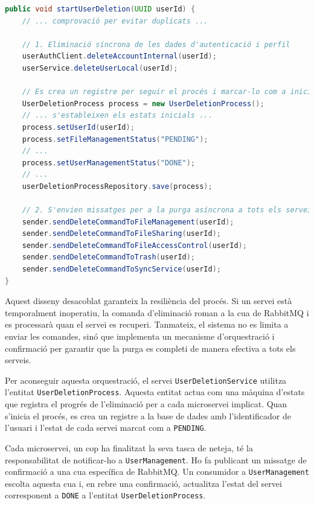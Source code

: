 \begin{lstlisting}[language=Java, caption={Inici del procés d'eliminació a `UserDeletionService`}]
public void startUserDeletion(UUID userId) {
    // ... comprovació per evitar duplicats ...

    // 1. Eliminació síncrona de les dades d'autenticació i perfil
    userAuthClient.deleteAccountInternal(userId);
    userService.deleteUserLocal(userId);

    // Es crea un registre per seguir el procés i marcar-lo com a iniciat
    UserDeletionProcess process = new UserDeletionProcess();
    // ... s'estableixen els estats inicials ...
    process.setUserId(userId);
    process.setFileManagementStatus("PENDING");
    // ...
    process.setUserManagementStatus("DONE");
    // ...
    userDeletionProcessRepository.save(process);

    // 2. S'envien missatges per a la purga asíncrona a tots els serveis implicats
    sender.sendDeleteCommandToFileManagement(userId);
    sender.sendDeleteCommandToFileSharing(userId);
    sender.sendDeleteCommandToFileAccessControl(userId);
    sender.sendDeleteCommandToTrash(userId);
    sender.sendDeleteCommandToSyncService(userId);
}
\end{lstlisting}

Aquest disseny desacoblat garanteix la resiliència del procés. Si un servei està temporalment inoperatiu, la comanda d'eliminació roman a la cua de RabbitMQ i es processarà quan el servei es recuperi. Tanmateix, el sistema no es limita a enviar les comandes, sinó que implementa un mecanisme d'orquestració i confirmació per garantir que la purga es completi de manera efectiva a tots els serveis.

Per aconseguir aquesta orquestració, el servei \texttt{UserDeletionService} utilitza l'entitat \texttt{UserDeletionProcess}. Aquesta entitat actua com una màquina d'estats que registra el progrés de l'eliminació per a cada microservei implicat. Quan s'inicia el procés, es crea un registre a la base de dades amb l'identificador de l'usuari i l'estat de cada servei marcat com a \texttt{PENDING}.

Cada microservei, un cop ha finalitzat la seva tasca de neteja, té la responsabilitat de notificar-ho a \texttt{UserManagement}. Ho fa publicant un missatge de confirmació a una cua específica de RabbitMQ. Un consumidor a \texttt{UserManagement} escolta aquesta cua i, en rebre una confirmació, actualitza l'estat del servei corresponent a \texttt{DONE} a l'entitat \texttt{UserDeletionProcess}.


